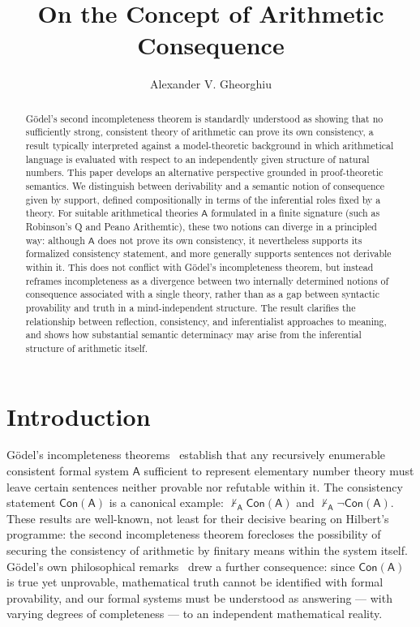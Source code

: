 \documentclass[reqno]{asl}
\title{On the Concept of Arithmetic Consequence}
\author{}
\date{}
\author{Alexander V. Gheorghiu }
\newcommand{\pa}{\textsf{A}}
\newcommand{\Con}{\textsf{Con}}
\begin{document}
\begin{abstract}
    G\"odel’s second incompleteness theorem is standardly understood as showing that no sufficiently strong, consistent theory of arithmetic can prove its own consistency, a result typically interpreted against a model-theoretic background in which arithmetical language is evaluated with respect to an independently given structure of natural numbers. This paper develops an alternative perspective grounded in proof-theoretic semantics. We distinguish between derivability and a semantic notion of consequence given by support, defined compositionally in terms of the inferential roles fixed by a theory. For suitable arithmetical theories $\pa$ formulated in a finite signature  (such as Robinson's \textsf{Q} and Peano Arithemtic), these two notions can diverge in a principled way: although $\pa$ does not prove its own consistency, it nevertheless supports its formalized consistency statement, and more generally supports sentences not derivable within it. This does not conflict with G\"odel's incompleteness theorem, but instead reframes incompleteness as a divergence between two internally determined notions of consequence associated with a single theory, rather than as a gap between syntactic provability and truth in a mind-independent structure. The result clarifies the relationship between reflection, consistency, and inferentialist approaches to meaning, and shows how substantial semantic determinacy may arise from the inferential structure of arithmetic itself.
\end{abstract}



\maketitle

\section{Introduction} \label{sec:introduction}

G\"odel's incompleteness theorems~\cite{godel1931undecidable} establish that any recursively enumerable 
consistent formal system $\pa$ sufficient to represent elementary number theory must leave certain 
sentences neither provable nor refutable within it. The consistency statement $\Con(\pa)$ is a 
canonical example: $\not\vdash_{\pa} \Con(\pa)$ and $\not\vdash_{\pa} \neg\Con(\pa)$. These results 
are well-known, not least for their decisive bearing on Hilbert's programme: the 
second incompleteness theorem forecloses the possibility of securing the consistency of arithmetic by 
finitary means within the system itself. G\"{o}del's own philosophical remarks~\cite{godel1951} drew 
a further consequence: since $\Con(\pa)$ is true yet unprovable, mathematical truth cannot be 
identified with formal provability, and our formal systems must be understood as answering --- with 
varying degrees of completeness --- to an independent mathematical reality.
\end{document}
